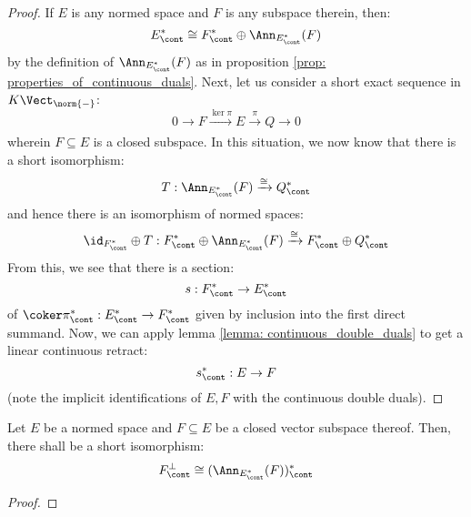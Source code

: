            \begin{proof}
                If $E$ is any normed space and $F$ is any subspace therein, then:
                    $$E^*_{\cont} \cong F^*_{\cont} \oplus \Ann_{E^*_{\cont}}(F)$$
                by the definition of $\Ann_{E^*_{\cont}}(F)$ as in proposition \ref{prop: properties_of_continuous_duals}. Next, let us consider a short exact sequence in $K\-\Vect_{\norm{-}}$:
                    $$0 \to F \xrightarrow[]{\ker \pi} E \xrightarrow[]{\pi} Q \to 0$$
                wherein $F \subseteq E$ is a closed subspace. In this situation, we now know that there is a short isomorphism:
                    $$T: \Ann_{E^*_{\cont}}(F) \xrightarrow[]{\cong} Q^*_{\cont}$$
                and hence there is an isomorphism of normed spaces:
                    $$\id_{F^*_{\cont}} \oplus T: F^*_{\cont} \oplus \Ann_{E^*_{\cont}}(F) \xrightarrow[]{\cong} F^*_{\cont} \oplus Q^*_{\cont}$$
                From this, we see that there is a section:
                    $$s: F^*_{\cont} \to E^*_{\cont}$$
                of $\coker \pi^*_{\cont}: E^*_{\cont} \to F^*_{\cont}$ given by inclusion into the first direct summand. Now, we can apply lemma \ref{lemma: continuous_double_duals} to get a linear continuous retract:
                    $$s^*_{\cont}: E \to F$$
                (note the implicit identifications of $E, F$ with the continuous double duals).
            \end{proof}
        \begin{corollary} \label{coro: annihilators_vs_orthogonal_complements}
            Let $E$ be a normed space and $F \subseteq E$ be a closed vector subspace thereof. Then, there shall be a short isomorphism:
                $$F^{\perp}_{\cont} \cong ( \Ann_{E^*_{\cont}}(F) )^*_{\cont}$$
        \end{corollary}
            \begin{proof}
            \end{proof}
